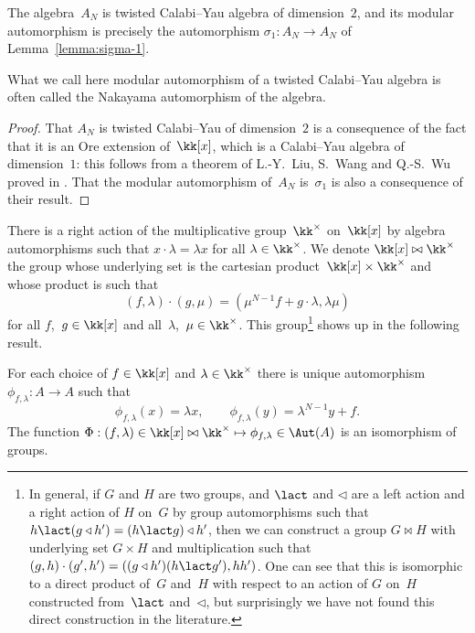 \begin{Proposition}\label{prop:CY}
The algebra~$A_N$ is twisted Calabi--Yau algebra of dimension~$2$, and its
modular automorphism is precisely the automorphism $\sigma_1:A_N\to A_N$ of
Lemma~\ref{lemma:sigma-1}.
\end{Proposition}

What we call here modular automorphism of a twisted Calabi--Yau algebra is
often called the Nakayama automorphism of the algebra.

\begin{proof}
That $A_N$ is twisted Calabi--Yau of dimension~$2$ is a consequence of the
fact that it is an Ore extension of~$\kk[x]$, which is a Calabi--Yau
algebra of dimension~$1$: this follows from a theorem of L.-Y.~Liu, S.~Wang
and Q.-S.~Wu proved in \cite{LWW}. That the modular automorphism of~$A_N$
is~$\sigma_1$ is also a consequence of their result.
\end{proof}

There is a right action of the multiplicative group~$\kk^\times$
on~$\kk[x]$ by algebra automorphisms such that $x\cdot\lambda = \lambda x$
for all $\lambda\in\kk^\times$. We denote $\kk[x]\bowtie\kk^\times$ the
group whose underlying set is the cartesian
product~$\kk[x]\times\kk^\times$ and whose product is such that
  \[
  (f,\lambda)\cdot(g,\mu) = (\mu^{N-1}f+g\cdot\lambda,\lambda\mu)
  \]
for all $f$,~$g\in\kk[x]$ and all~$\lambda$,~$\mu\in\kk^\times$. This
group\footnote{In general, if $G$ and $H$ are two groups, and $\lact$ and
$\triangleleft$ are a left action and a right action of $H$ on~$G$ by group
automorphisms such that $h\lact(g\triangleleft h')=(h\lact g)\triangleleft
h'$, then we can construct a group $G\bowtie H$ with underlying set
$G\times H$ and multiplication such that
$(g,h)\cdot(g',h')=((g\triangleleft h')(h\lact g'),hh')$. One can see that
this is isomorphic to a direct product of~$G$ and~$H$ with respect to an
action of $G$ on~$H$ constructed from~$\lact$ and~$\triangleleft$, but
surprisingly we have not found this direct construction in the literature.}
shows up in the following result.

\begin{Proposition}\label{prop:aut}
For each choice of $f\in\kk[x]$ and $\lambda\in\kk^\times$ there is unique
automorphism $\phi_{f,\lambda}:A\to A$ such that 
  \[
  \phi_{f,\lambda}(x) = \lambda x,
  \qquad
  \phi_{f,\lambda}(y) = \lambda^{N-1}y + f.
  \]
The function
$\Phi:(f,\lambda)\in\kk[x]\bowtie\kk^\times\mapsto\phi_{f,\lambda}\in\Aut(A)$
is an isomorphism of groups.
\end{Proposition}

